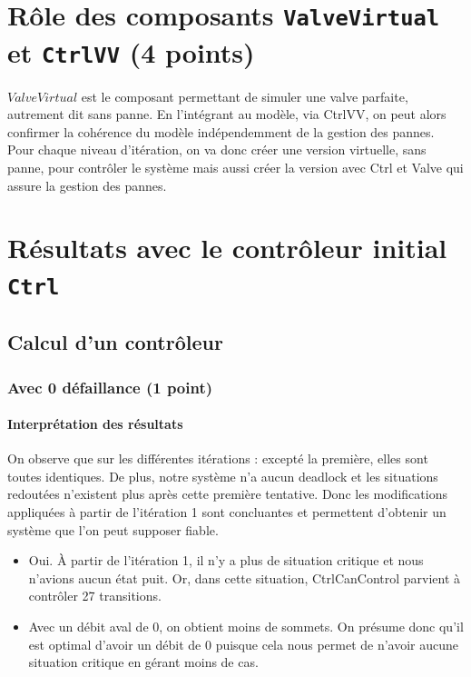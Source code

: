 \documentclass[a4paper]{book}
\begin{document}
\section{Rôle des composants {\tt ValveVirtual} et {\tt CtrlVV} (4 points)}

$ValveVirtual$ est le composant permettant de simuler une valve parfaite, autrement dit sans panne. En l'intégrant au modèle, via CtrlVV, on peut alors confirmer la cohérence du modèle indépendemment de la gestion des pannes. \\
Pour chaque niveau d'itération, on va donc créer une version virtuelle, sans panne, pour contrôler le système mais aussi créer la version avec Ctrl et Valve qui assure la gestion des pannes.

\section{Résultats avec le contrôleur initial {\tt Ctrl}}

\subsection{Calcul d'un contrôleur}

\subsubsection{Avec 0 défaillance (1 point)}





\paragraph{Interprétation des résultats}

On observe que sur les différentes itérations : excepté la première, elles sont toutes identiques. De plus, notre système n'a aucun deadlock et les situations redoutées n'existent plus après cette première tentative. Donc les modifications appliquées à partir de l'itération 1 sont concluantes et permettent d'obtenir un système que l'on peut supposer fiable.

\begin{itemize}
	\item Oui. À partir de l'itération 1, il n'y a plus de situation critique et nous n'avions aucun état puit. Or, dans cette situation, CtrlCanControl parvient à contrôler 27 transitions.
	\item Avec un débit aval de 0, on obtient moins de sommets. On présume donc qu'il est optimal d'avoir un débit de 0 puisque cela nous permet de n'avoir aucune situation critique en gérant moins de cas.

\end{itemize}
\end{document}
